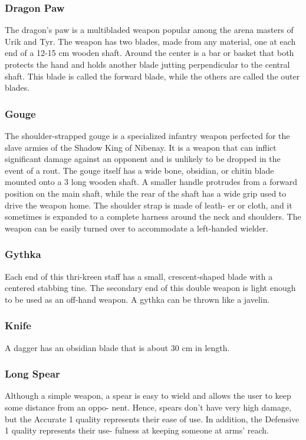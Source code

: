\begin{multicols}{2}
\subsubsection{Dragon Paw}
\label{itmmlee:dragonpaw}
The dragon's paw is a multibladed weapon
popular among the arena masters of
Urik and Tyr. The weapon has two blades,
made from any material, one at each end
of a 12-15 cm wooden shaft. Around the center
is a bar or basket that both protects the
hand and holds another blade jutting
perpendicular to the central shaft. This
blade is called the forward blade, while
the others are called the outer blades.

\subsubsection{Gouge}
\label{itmmlee:gouge}
The shoulder-strapped gouge is a specialized
infantry weapon perfected for the
slave armies of the Shadow King of Nibenay.
It is a weapon that can inflict significant
damage against an opponent and is
unlikely to be dropped in the event of a
rout. The gouge itself has a wide bone,
obsidian, or chitin blade mounted onto a
3 long wooden shaft. A smaller handle
protrudes from a forward position on the
main shaft, while the rear of the shaft has
a wide grip used to drive the weapon
home. The shoulder strap is made of leath-
er or cloth, and it sometimes is expanded
to a complete harness around the neck
and shoulders. The weapon can be easily
turned over to accommodate a left-handed
wielder.

\subsubsection{Gythka}
\label{itmmlee:gythka}
Each end of this thri-kreen staff has a
small, crescent-shaped blade with a centered stabbing
tine. The secondary end of this double weapon is light
enough to be used as an off-hand weapon. A gythka
can be thrown like a javelin.

\subsubsection{Knife}
\label{itmmlee:knife}
A dagger has an obsidian blade that is about 30 cm in length.

\subsubsection{Long Spear}
\label{itmmlee:longspear}
Although a simple weapon, a spear is easy to wield and
allows the user to keep some distance from an oppo-
nent. Hence, spears don’t have very high damage, but
the Accurate 1 quality represents their ease of use. In
addition, the Defensive 1 quality represents their use-
fulness at keeping someone at arms’ reach.


\end{multicols}
